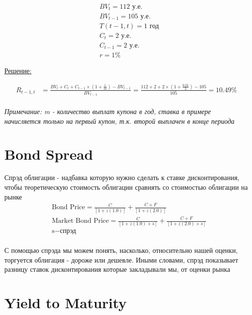\documentclass{article}
\begin{document}
\begin{align*}
    & BV_{t} = 112\text{ у.е.}\\
    & BV_{t-1} = 105\text{ у.е.}\\
    & T(t-1,t) = 1 \text{ год}\\
    & C_{t} = 2\text{ у.е.}\\
    & C_{t-1} = 2\text{ у.е.}\\
    & r = 1\% 
\end{align*}
\begin{center}
\underline{Решение:}
\end{center}
\begin{align*}
    R_{t-1,t} &= \frac{BV_{t} + C_{t} + C_{t-1}\times(1 + \frac{r}{m}) - BV_{t-1}}{BV_{t-1}} =\frac{112 + 2 + 2\times(1 + \frac{0.01}{2}) - 105}{105} = 10.49\%
\end{align*}
\\
\textit{Примечание: m - количество выплат купона в год, ставка в примере начисляется только на первый купон, т.к. второй выплачен в конце периода}

 \section{Bond Spread}

Спрэд облигации - надбавка которую нужно сделать к ставке дисконтирования, чтобы теоретическую стоимость облигации сравнять со стоимостью облигации на рынке
\\
\begin{align*}
    & \text{Bond Price} = \frac{C}{[1 + z(1.0)]} + \frac{C + F}{[1 + z(2.0)]}\\
    & \text{Market Bond Price} = \frac{C}{[1 + z(1.0) + s]} + \frac{C + F}{[1 + z(2.0) + s]}\\
    & \text{s} - \text{спрэд}
\end{align*}
\\
С помощью спрэда мы можем понять, насколько, относительно нашей оценки, торгуется облигация - дороже или дешевле. Иными словами, спрэд показывает разницу ставок дисконтирования которые закладывали мы, от оценки рынка

 \section{Yield to Maturity}
\end{document}
